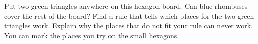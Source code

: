 \documentclass[12pt]{extarticle}
\begin{document}
\newpage
\prob Put two green triangles  anywhere on this hexagon board. Can blue rhombuses  cover the rest of the board? Find a rule that tells which places for the two green triangles work. Explain why the places that do not fit your rule can never work. You can mark the places you try on the small hexagons.

\vspace{14pt}
\begin{center}

\vspace{20pt}
\hspace{0.3in}\hspace{0.3in}\hspace{0.3in}\hspace{0.3in}

\vspace{14pt}
\hspace{0.3in}\hspace{0.3in}\hspace{0.3in}\hspace{0.3in}
\end{center}

\vspace{4pt}
\end{document}
